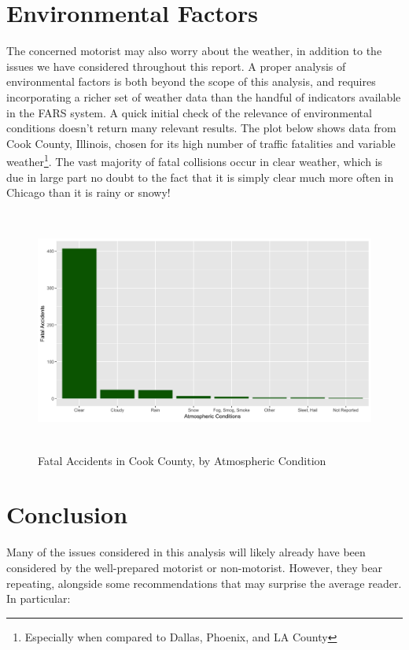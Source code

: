 \documentclass[11pt, oneside,titlepage]{article}   	%
\begin{document}
\section*{Environmental Factors}
The concerned motorist may also worry about the weather, in addition to the issues we have considered throughout this report. A proper analysis of environmental factors is both beyond the scope of this analysis, and requires incorporating a richer set of weather data than the handful of indicators available in the FARS system. A quick initial check of the relevance of environmental conditions doesn't return many relevant results. The plot below shows data from Cook County, Illinois, chosen for its high number of traffic fatalities and variable weather\footnote{Especially when compared to Dallas, Phoenix, and LA County}. The vast majority of fatal collisions occur in clear weather, which is due in large part no doubt to the fact that it is simply clear much more often in Chicago than it is rainy or snowy! 

\begin{figure}[H]
\centering
  \includegraphics[width=15cm,height=8cm,keepaspectratio]{Environmental.png}
\caption{Fatal Accidents in Cook County, by Atmospheric Condition}
\end{figure}


\section*{Conclusion}

Many of the issues considered in this analysis will likely already have been considered by the well-prepared motorist or non-motorist. However, they bear repeating, alongside some recommendations that may surprise the average reader. In particular:
\end{document}
